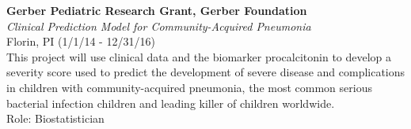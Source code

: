 \documentclass{nihbiosketch}
\begin{document}
\bigskip

\textbf{Gerber Pediatric Research Grant, Gerber Foundation}\\
\emph{Clinical Prediction Model for Community-Acquired Pneumonia}\\
Florin, PI (1/1/14 - 12/31/16)\\
This project will use clinical data and the biomarker procalcitonin to
develop a severity score used to predict the development of severe
disease and complications in children with community-acquired pneumonia,
the most common serious bacterial infection children and leading killer
of children worldwide.\\
Role: Biostatistician
\end{document}

